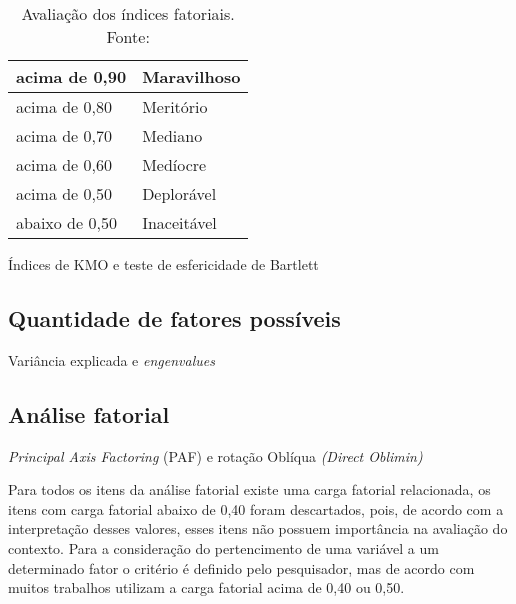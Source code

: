 \begin{table}[H]
\centering
\caption{Avaliação dos índices fatoriais. Fonte: \cite{kaiser1974}}
\label{table:indicesfatoriais}
\begin{tabular}{|l|l|}
\hline
acima de 0,90  & Maravilhoso \\ \hline
acima de 0,80  & Meritório   \\ \hline
acima de 0,70  & Mediano     \\ \hline
acima de 0,60  & Medíocre    \\ \hline
acima de 0,50  & Deplorável  \\ \hline
abaixo de 0,50 & Inaceitável \\ \hline
\end{tabular}%
\end{table}


Índices de KMO e teste de esfericidade de Bartlett

\subsection{Quantidade de fatores possíveis}
Variância explicada e \textit{engenvalues}

\subsection{Análise fatorial}
\textit{Principal Axis Factoring} (PAF) e rotação Oblíqua \textit{(Direct Oblimin)}

Para todos os itens da análise fatorial existe uma carga fatorial relacionada, os itens com carga fatorial abaixo de 0,40 foram descartados, pois, de acordo com a interpretação desses valores, esses itens não possuem importância na avaliação do contexto. Para a consideração do pertencimento de uma variável a um determinado fator o critério é definido pelo pesquisador, mas de acordo com \cite{andreoli1994} muitos trabalhos utilizam a carga fatorial acima de 0,40 ou 0,50.